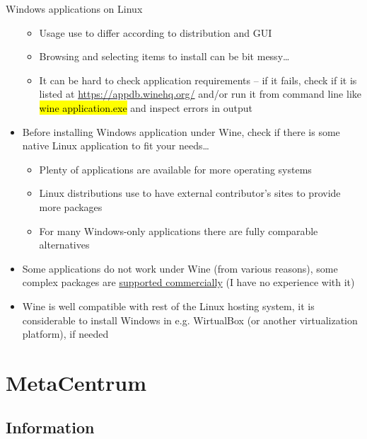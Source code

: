 \documentclass[compress, ucs, xelatex, 11pt, xcolor=svgnames,
  hyperref={
    bookmarks=true,
    unicode=true,
    colorlinks=true,
    pdftitle={Linux, command line and MetaCentrum},
    plainpages=false,
    pdfauthor={Vojtech Zeisek},
    pdfsubject={Course about use of Linux command line, writing shell scripts and using MetaCentrum of CESNET},
    pdfcreator={XeLaTeX},
    pdfkeywords={Linux, GNU, BASH, shell, command line, MetaCentrum},
    linkcolor=DarkRed,
    anchorcolor=DarkBlue,
    citecolor=Indigo,
    filecolor=NavyBlue,
    menucolor=DarkMagenta,
    urlcolor=DarkBlue,
    pdftex},
  url={hyphens, lowtilde} %
  ]{beamer}
\renewcommand{\texttt}[1]{\hl{\ttfamily #1}}
\begin{document}
\begin{frame}[allowframebreaks]{Windows applications on Linux}
\begin{itemize}
    \begin{itemize}
      \item Usage use to differ according to distribution and GUI
      \item Browsing and selecting items to install can be bit messy\ldots
      \item It can be hard to check application requirements -- if it fails, check if it is listed at \url{https://appdb.winehq.org/} and/or run it from command line like \texttt{wine application.exe} and inspect errors in output
    \end{itemize}
    \item Before installing Windows application under Wine, check if there is some native Linux application to fit your needs\ldots
    \begin{itemize}
      \item Plenty of applications are available for more operating systems
      \item Linux distributions use to have external contributor's sites to provide more packages
      \item For many Windows-only applications there are fully comparable alternatives
    \end{itemize}
    \item Some applications do not work under Wine (from various reasons), some complex packages are \href{https://www.codeweavers.com/}{supported commercially} (I have no experience with it)
    \item Wine is well compatible with rest of the Linux hosting system, it is considerable to install Windows in e.g. WirtualBox (or another virtualization platform), if needed
  \end{itemize}
\end{frame}

\section{MetaCentrum}

\subsection{Information}
\end{document}
